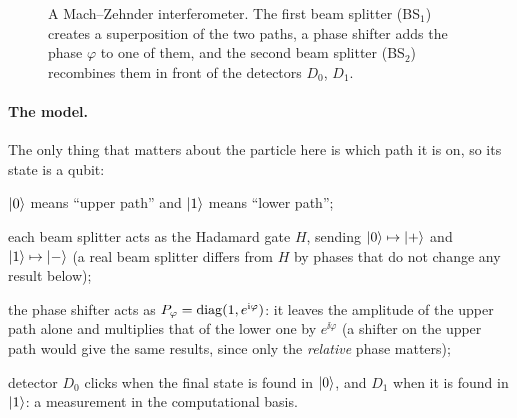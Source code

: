 \begin{figure}[htb]
  \centering
  \caption{A Mach--Zehnder interferometer. The first beam splitter (BS$_1$) creates a superposition of the two paths, a phase shifter adds the phase $\varphi$ to one of them, and the second beam splitter (BS$_2$) recombines them in front of the detectors $D_0$, $D_1$.}
  \label{fig:mz}
\end{figure}

\paragraph{The model.}
The only thing that matters about the particle here is which path it is on, so its state is a qubit:
\begin{steps}
  \item $\left|0\right\rangle$ means ``upper path'' and $\left|1\right\rangle$ means ``lower path'';
  \item each beam splitter acts as the Hadamard gate $H$, sending $\left|0\right\rangle\mapsto\left|+\right\rangle$ and $\left|1\right\rangle\mapsto\left|-\right\rangle$ (a real beam splitter differs from $H$ by phases that do not change any result below);
  \item the phase shifter acts as $P_\varphi=\operatorname{diag}(1,e^{\mathrm{i}\varphi})$: it leaves the amplitude of the upper path alone and multiplies that of the lower one by $e^{\ii\varphi}$ (a shifter on the upper path would give the same results, since only the \emph{relative} phase matters);
  \item detector $D_0$ clicks when the final state is found in $\left|0\right\rangle$, and $D_1$ when it is found in $\left|1\right\rangle$: a measurement in the computational basis.
\end{steps}

